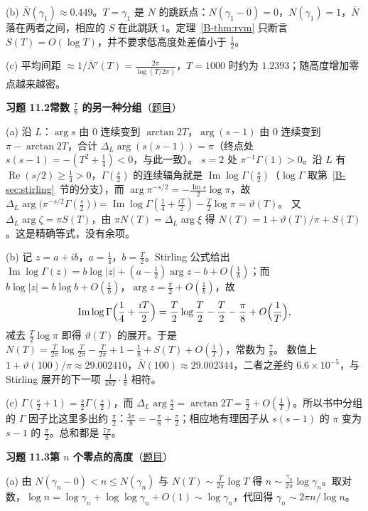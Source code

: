 \documentclass[11pt,a4paper]{article}
\renewcommand{\Re}{\operatorname{Re}}
\renewcommand{\Im}{\operatorname{Im}}
\newcommand{\bref}[1]{\ref*{B-#1}}
\newcommand{\Sol}[2]{%
  \par\addvspace{1.2em}\noindent
  \hypertarget{s:#1}{}\textbf{习题 #1\quad #2}\hfill{\small（\hyperlink{q:#1}{题目}）}\par
  \nopagebreak\smallskip}
\begin{document}
(b) $\bar N(\gamma_1)\approx0.449$。$T=\gamma_1$ 是 $N$ 的跳跃点：$N(\gamma_1-0)=0$，$N(\gamma_1)=1$，$\bar N$ 落在两者之间，相应的 $S$ 在此跳跃 $1$。定理~\bref{thm:rvm} 只断言 $S(T)=O(\log T)$，并不要求低高度处差值小于 $\frac12$。

(c) 平均间距 $\approx1/\bar N'(T)=\frac{2\pi}{\log(T/2\pi)}$，$T=1000$ 时约为 $1.2393$；随高度增加零点越来越密。

\Sol{11.2}{常数 $\tfrac78$ 的另一种分组}
(a) 沿 $L$：$\arg s$ 由 $0$ 连续变到 $\arctan2T$，$\arg(s-1)$ 由 $0$ 连续变到 $\pi-\arctan2T$，合计 $\Delta_L\arg(s(s-1))=\pi$（终点处 $s(s-1)=-(T^2+\frac14)<0$，与此一致）。
$s=2$ 处 $\pi^{-1}\Gamma(1)>0$。沿 $L$ 有 $\Re(s/2)\ge\frac14>0$，$\Gamma(\frac s2)$ 的连续辐角就是 $\Im\log\Gamma(\frac s2)$（$\log\Gamma$ 取第~\bref{sec:stirling}~节的分支），而 $\arg\pi^{-s/2}=-\frac{\Im s}2\log\pi$，故
$\Delta_L\arg\bigl(\pi^{-s/2}\Gamma(\frac s2)\bigr)=\Im\log\Gamma(\frac14+\frac{iT}2)-\frac T2\log\pi=\vartheta(T)$。
又 $\Delta_L\arg\zeta=\pi S(T)$，由 $\pi N(T)=\Delta_L\arg\xi$ 得 $N(T)=1+\vartheta(T)/\pi+S(T)$。这是精确等式，没有余项。

(b) 记 $z=a+ib$，$a=\frac14$，$b=\frac T2$。Stirling 公式给出
$\Im\log\Gamma(z)=b\log|z|+(a-\frac12)\arg z-b+O(\frac1b)$；而 $b\log|z|=b\log b+O(\frac1b)$，$\arg z=\frac\pi2+O(\frac1b)$，故
\[
  \Im\log\Gamma\Bigl(\frac14+\frac{iT}2\Bigr)=\frac T2\log\frac T2-\frac T2-\frac\pi8+O\Bigl(\frac1T\Bigr),
\]
减去 $\frac T2\log\pi$ 即得 $\vartheta(T)$ 的展开。于是 $N(T)=\frac T{2\pi}\log\frac T{2\pi}-\frac T{2\pi}+1-\frac18+S(T)+O(\frac1T)$，常数为 $\frac78$。
数值上 $1+\vartheta(100)/\pi\approx29.002410$，$\bar N(100)\approx29.002344$，二者之差约 $6.6\times10^{-5}$，与 Stirling 展开的下一项 $\frac1{48T}\cdot\frac1\pi$ 相符。

(c) $\Gamma(\frac s2+1)=\frac s2\Gamma(\frac s2)$，而 $\Delta_L\arg\frac s2=\arctan2T=\frac\pi2+O(\frac1T)$。所以书中分组的 $\Gamma$ 因子比这里多出约 $\frac\pi2$：$\frac{3\pi}8=-\frac\pi8+\frac\pi2$；相应地有理因子从 $s(s-1)$ 的 $\pi$ 变为 $s-1$ 的 $\frac\pi2$。总和都是 $\frac{7\pi}8$。

\Sol{11.3}{第 $n$ 个零点的高度}
(a) 由 $N(\gamma_n-0)<n\le N(\gamma_n)$ 与 $N(T)\sim\frac T{2\pi}\log T$ 得 $n\sim\frac{\gamma_n}{2\pi}\log\gamma_n$。取对数，$\log n=\log\gamma_n+\log\log\gamma_n+O(1)\sim\log\gamma_n$，代回得 $\gamma_n\sim2\pi n/\log n$。
\end{document}
